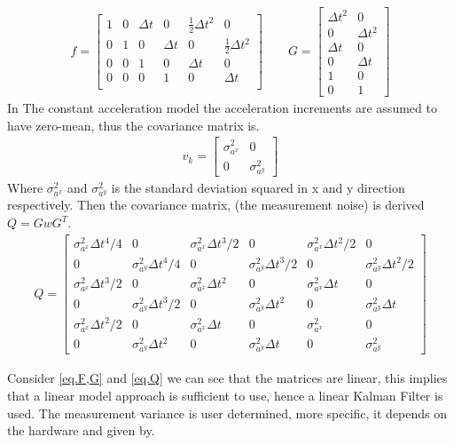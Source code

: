 \begin{align}
f=
\begin{bmatrix}
1 & 0 & \Delta t & 0 & \frac{1}{2}\Delta t^2 & 0 \\ 
0 & 1 & 0 &\Delta t & 0 & \frac{1}{2}\Delta t^2 \\ 
0 & 0 & 1 & 0 & \Delta t & 0 \\ 
0 & 0 & 0 & 1 & 0 & \Delta t \\ 
\end{bmatrix}
\qquad G=
\begin{bmatrix}
\Delta t^2 & 0\\
0 & \Delta t^2\\
\Delta t & 0\\
0 & \Delta t\\
1 & 0\\
0 & 1
\end{bmatrix}
\label{eq.F,G}
\end{align}
In The constant acceleration model the acceleration increments are assumed to have zero-mean, thus the covariance matrix is.
\begin{align}
v_k=
\begin{bmatrix}
\sigma^2_{a^x} & 0\\
0 & \sigma^2_{a^y}
\end{bmatrix}
\end{align}
Where $\sigma^2_{a^x}$ and $\sigma^2_{a^y}$ is the standard deviation squared in x and y direction respectively.
Then the covariance matrix, (the measurement noise) is derived $Q=GwG^T$.
\begin{align}
Q=
\begin{bmatrix}
\sigma^2_{a^x}\Delta t^4/4 & 0 & \sigma^2_{a^x}\Delta t^3/2 & 0 & \sigma^2_{a^x}\Delta t^2/2 & 0\\
0 & \sigma^2_{a^y}\Delta t^4/4 & 0 & \sigma^2_{a^y}\Delta t^3/2 & 0 & \sigma^2_{a^y}\Delta t^2/2\\
\sigma^2_{a^x}\Delta t^3/2 & 0 & \sigma^2_{a^x}\Delta t^2 & 0 & \sigma^2_{a^x}\Delta t & 0\\
0 & \sigma^2_{a^y}\Delta t^3/2 & 0 & \sigma^2_{a^y}\Delta t^2 & 0 & \sigma^2_{a^y}\Delta t\\
\sigma^2_{a^x}\Delta t^2/2 & 0 & \sigma^2_{a^x}\Delta t & 0 & \sigma^2_{a^x} & 0\\
0 & \sigma^2_{a^y}\Delta t^2 & 0 & \sigma^2_{a^y}\Delta t & 0 & \sigma^2_{a^y}
\end{bmatrix}
\label{eq.Q}
\end{align}

Consider \eqref{eq.F,G} and \eqref{eq.Q} we can see that the matrices are linear, this implies that a linear model approach is sufficient to use, hence a linear Kalman Filter is used. The measurement variance is user determined, more specific, it depends on the hardware and given by.

